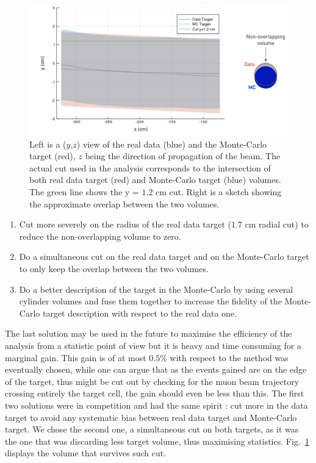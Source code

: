 \begin{figure}[!h]
	\includegraphics[scale=0.4]{./gfx/Targetcut.png}
	\caption{Left is a ($y$,$z$) view of the real data (blue) and the Monte-Carlo target (red), $z$ being the direction of propagation of the beam. The actual cut used in the analysis corresponds to the intersection of both real data target (red) and Monte-Carlo target (blue) volumes. The green line shows the y = $1.2$ cm cut. Right is a sketch showing the approximate overlap between the two volumes.}
	\label{pic:Target}
\end{figure}

\begin{enumerate}
  \item Cut more severely on the radius of the real data target ($1.7$ cm radial cut) to reduce the non-overlapping volume to zero.
  \item Do a simultaneous cut on the real data target and on the Monte-Carlo target to only keep the overlap between the two volumes.
  \item Do a better description of the target in the Monte-Carlo by using several cylinder volumes and fuse them together to increase the fidelity of the Monte-Carlo target description with respect to the real data one.
\end{enumerate}

The last solution may be used in the future to maximise the efficiency of the analysis from a statistic point of view but it is heavy and time consuming for a marginal gain. This gain is of at most $0.5$\% with respect to the method was eventually chosen, while one can argue that as the events gained are on the edge of the target, thus might be cut out by checking for the muon beam trajectory crossing entirely the target cell, the gain should even be less than this.
The first two solutions were in competition and had the same spirit : cut more in the data target to avoid any systematic bias between real data target and Monte-Carlo target. We chose the second one, a simultaneous cut on both targets, as it was the one that was discarding less target volume, thus maximising statistics. Fig.~\ref{pic:Target} displays the volume that survives such cut.

